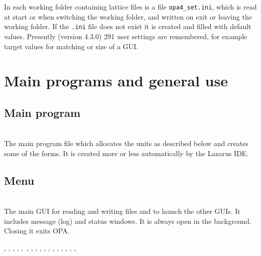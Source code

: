\documentclass[12pt]{article}
\newcommand\code[1]{{\tt #1}}
\newcommand{\opagui}[1]{\colorbox{blue!20}{{\color{black}\code{#1}}}}
\newcommand{\oguih}[2]{\subsection{\label{#2}#1}{\Huge\opagui{#2}}\\}
\newcommand{\ogui}[1]{\hyperref[#1]{\opagui{#1}}}
\newcommand{\opauni}[1]{\colorbox{orange!30}{{\color{black}\code{#1}}}}
\newcommand{\ounih}[2]{\subsection{\label{#2}#1}{\Huge\opauni{#2}}\\}
\newcommand{\ouni}[1]{\hyperref[#1]{\opauni{#1}}}
\newcommand{\uses}[1]{\flushleft {\bf Uses:} #1}
\newcommand{\desc}[1]{#1}
\begin{document}
In each working folder containing lattice files is a file \code{opa4\_set.ini}, which is read at start or when switching the working folder, and written on exit or leaving the working folder. If the \code{.ini} file does not exist it is created and filled with default values. Presently (version 4.3.0) 291 user settings are remembered, for example target values for matching or size of a GUI. 



\section{\label{secglob}Main programs and general use}

\ounih{Main program}{{opa.lpr}}

\desc{The main program file which allocates the units as described below and creates some of the forms. It is created more or less automatically by the Lazarus IDE.}


\oguih{Menu}{opamenu}

\desc{The main GUI for reading and writing files and to launch the other GUIs. It includes message (log) and status windows. It is always open in the background. Closing it exits OPA.}

\uses{\ouni{globlib}, \ogui{opaeditor}, \ogui{opatexteditor}, \ouni{editorlib}, \ouni{latfilelib},\ \ogui{opalinop}, \ogui{opatunediag}, 
  \ogui{opamomentum}, \ogui{opachroma}, \ogui{opatrackps},  \ogui{opatrackda}, \ogui{opatracktt}, \ogui{opaorbit},
  \ogui{opageometry}, \ogui{opalgbedit}, \ogui{opabucket}, \ogui{opacurrents}, \ouni{testcode}}
 
\end{document}
